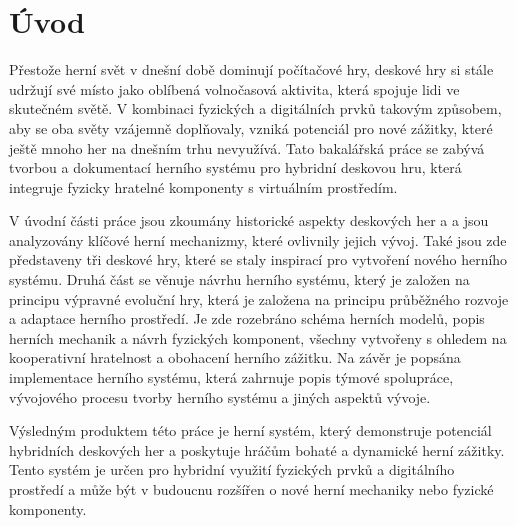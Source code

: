 \chapter{Úvod}

Přestože herní svět v dnešní době dominují počítačové hry, deskové hry si stále udržují své místo jako oblíbená volnočasová aktivita, která spojuje lidi ve skutečném světě. V kombinaci fyzických a digitálních prvků takovým způsobem, aby se oba světy vzájemně doplňovaly, vzniká potenciál pro nové zážitky, které ještě mnoho her na dnešním trhu nevyužívá. Tato bakalářská práce se zabývá tvorbou a dokumentací herního systému pro hybridní deskovou hru, která integruje fyzicky hratelné komponenty s virtuálním prostředím.

V úvodní části práce jsou zkoumány historické aspekty deskových her a a jsou analyzovány klíčové herní mechanizmy, které ovlivnily jejich vývoj. Také jsou zde představeny tři deskové hry, které se staly inspirací pro vytvoření nového herního systému. Druhá část se věnuje návrhu herního systému, který je založen na principu výpravné evoluční hry, která je založena na principu průběžného rozvoje a adaptace herního prostředí. Je zde rozebráno schéma herních modelů, popis herních mechanik a návrh fyzických komponent, všechny vytvořeny s ohledem na kooperativní hratelnost a obohacení herního zážitku. Na závěr je popsána implementace herního systému, která zahrnuje popis týmové spolupráce, vývojového procesu tvorby herního systému a jiných aspektů vývoje. 

Výsledným produktem této práce je herní systém, který demonstruje potenciál hybridních deskových her a poskytuje hráčům bohaté a dynamické herní zážitky. Tento systém je určen pro hybridní využití fyzických prvků a digitálního prostředí a může být v budoucnu rozšířen o nové herní mechaniky nebo fyzické komponenty.

